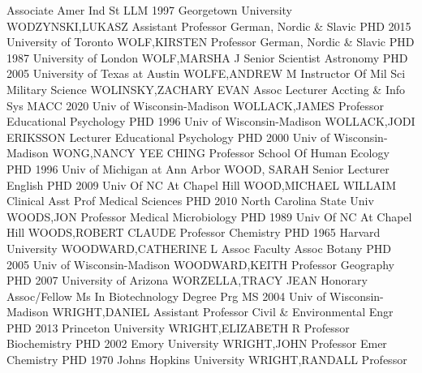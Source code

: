 \documentclass[
]{article}
\begin{document}
Associate \textbar Amer Ind St \textbar LLM 1997 Georgetown University
\textbar{}  \textbar WODZYNSKI,LUKASZ \textbar Assistant
Professor \textbar German, Nordic \& Slavic \textbar PHD 2015 University
of Toronto \textbar{}  \textbar WOLF,KIRSTEN
\textbar Professor \textbar German, Nordic \& Slavic \textbar PHD 1987
University of London \textbar{}  \textbar WOLF,MARSHA J
\textbar Senior Scientist \textbar Astronomy \textbar PHD 2005
University of Texas at Austin \textbar{} 
\textbar WOLFE,ANDREW M \textbar Instructor Of Mil Sci \textbar Military
Science \textbar WOLINSKY,ZACHARY EVAN \textbar{} 
\textbar Assoc Lecturer \textbar Accting \& Info Sys \textbar MACC 2020
Univ of Wisconsin-Madison \textbar WOLLACK,JAMES \textbar{} 
\textbar Professor \textbar Educational Psychology \textbar PHD 1996
Univ of Wisconsin-Madison \textbar WOLLACK,JODI ERIKSSON \textbar{}
 \textbar Lecturer \textbar Educational Psychology
\textbar PHD 2000 Univ of Wisconsin-Madison \textbar WONG,NANCY YEE
CHING \textbar{}  \textbar Professor \textbar School Of
Human Ecology \textbar PHD 1996 Univ of Michigan at Ann Arbor
\textbar WOOD, SARAH \textbar{}  \textbar Senior Lecturer
\textbar English \textbar PHD 2009 Univ Of NC At Chapel Hill
\textbar WOOD,MICHAEL WILLAIM \textbar{}  \textbar Clinical
Asst Prof \textbar Medical Sciences \textbar PHD 2010 North Carolina
State Univ \textbar WOODS,JON \textbar{}  \textbar Professor
\textbar Medical Microbiology \textbar PHD 1989 Univ Of NC At Chapel
Hill \textbar WOODS,ROBERT CLAUDE \textbar{} 
\textbar Professor \textbar Chemistry \textbar PHD 1965 Harvard
University \textbar WOODWARD,CATHERINE L \textbar{} 
\textbar Assoc Faculty Assoc \textbar Botany \textbar PHD 2005 Univ of
Wisconsin-Madison \textbar WOODWARD,KEITH \textbar{} 
\textbar Professor \textbar Geography \textbar PHD 2007 University of
Arizona \textbar WORZELLA,TRACY JEAN \textbar{} 
\textbar Honorary Assoc/Fellow \textbar Ms In Biotechnology Degree Prg
\textbar MS 2004 Univ of Wisconsin-Madison \textbar WRIGHT,DANIEL
\textbar{}  \textbar Assistant Professor \textbar Civil \&
Environmental Engr \textbar PHD 2013 Princeton University
\textbar WRIGHT,ELIZABETH R \textbar{}  \textbar Professor
\textbar Biochemistry \textbar PHD 2002 Emory University
\textbar WRIGHT,JOHN \textbar{}  \textbar Professor Emer
\textbar Chemistry \textbar PHD 1970 Johns Hopkins University
\textbar WRIGHT,RANDALL \textbar{}  \textbar Professor
\end{document}
